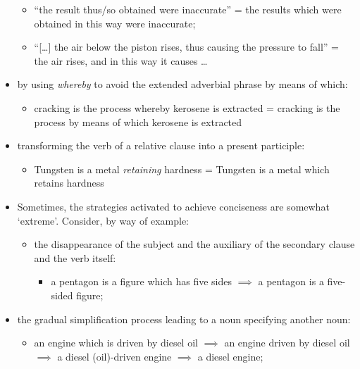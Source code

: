 \begin{itemize}
\begin{itemize}

\item “the result thus/so obtained were inaccurate” = the results which were obtained in this way were inaccurate;
\item “[…] the air below the piston rises, thus causing the pressure to fall” = the air rises, and in this way it causes …

\end{itemize}

\item by using \textit{whereby} to avoid the extended adverbial phrase by means of which:

\begin{itemize}
\item cracking is the process whereby kerosene is extracted = cracking is the process by means of which kerosene is extracted 
\end{itemize}

\item transforming the verb of a relative clause into a present participle:

\begin{itemize}
\item Tungsten is a metal \textit{retaining} hardness = Tungsten is a metal which retains hardness
\end{itemize}

\item Sometimes, the strategies activated to achieve conciseness are somewhat ‘extreme’. Consider, by way of example:

\begin{itemize}
\item the disappearance of the subject and the auxiliary of the secondary clause and the verb itself:
\begin{itemize}
\item a pentagon is a figure which has five sides $\implies$ a pentagon is a five-sided figure;
\end{itemize}
\end{itemize}

\item the gradual simplification process leading to a noun specifying another noun:

\begin{itemize}
\item an engine which is driven by diesel oil $\implies$ an engine driven by diesel oil $\implies$ a diesel (oil)-driven engine $\implies$ a diesel engine;
\end{itemize}

\end{itemize}

